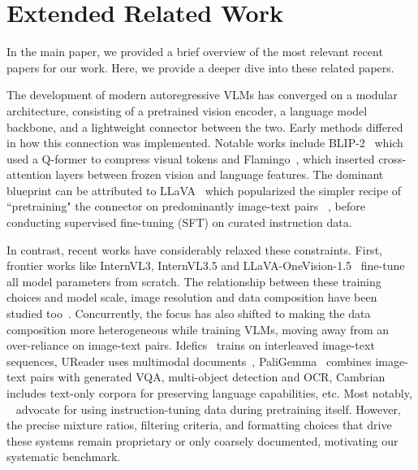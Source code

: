 \clearpage


\section{Extended Related Work}\label{app:related-work}

In the main paper, we provided a brief overview of the most relevant recent papers for our work. Here, we provide a deeper dive into these related papers.



The development of modern autoregressive VLMs has converged on a modular architecture, consisting of a pretrained vision encoder, a language model backbone, and a lightweight connector between the two. Early methods differed in how this connection was implemented.  Notable works include BLIP-2~\citep{li2023blip} which used a Q-former to compress visual tokens and Flamingo~\citep{alayrac2022flamingo}, which inserted cross-attention layers between frozen vision and language features. The dominant blueprint can be attributed to  LLaVA~\citep{liu2023visual,liu2024improved,liu2024llavanext} which popularized the simpler recipe of ``pretraining" the connector on predominantly image-text pairs ~\citep{an2025llava}, before conducting supervised fine-tuning (SFT) on curated instruction data. 

In contrast, recent works have considerably relaxed these constraints. First, frontier works like InternVL3\cite{zhu2025internvl3}, InternVL3.5\cite{wang2025internvl3} and LLaVA-OneVision-1.5~\citep{an2025llava} fine-tune all model parameters from scratch. The relationship between these training choices and model scale, image resolution and data composition have been studied too~\citep{mckinzie2024mm1,zhang2024mm1}. Concurrently, the focus has also shifted to making the data composition more heterogeneous while training VLMs, moving away from an over-reliance on image-text pairs. Idefics~\citep{laurenccon2023obelics,laurenccon2024idefics2} trains on interleaved image-text sequences, UReader uses multimodal documents~\citep{ye2023ureader}, PaliGemma~\citep{beyer2024paligemma} combines image-text pairs with generated VQA, multi-object detection and OCR,  Cambrian~\citep{tong2024cambrian} includes text-only corpora for preserving language capabilities, etc. Most notably, ~\citep{zhu2025internvl3,wiedmann2025finevision} advocate for using instruction-tuning data during pretraining itself. However, the precise mixture ratios, filtering criteria, and formatting choices that drive these systems remain proprietary or only coarsely documented, motivating our systematic benchmark.


